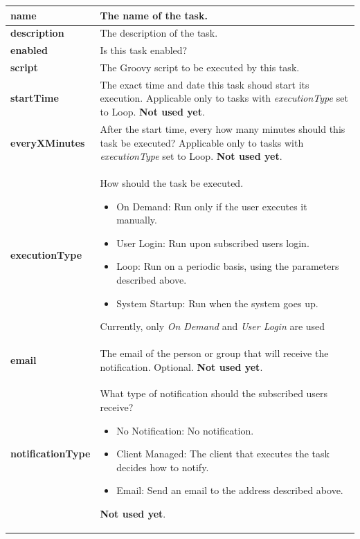 \documentclass[a4paper]{article}
\begin{document}
		\begin{table}[h!]
			\centering
			\begin{tabular}{lp{10cm}}
				\textbf{name} & The name of the task. \\
				\midrule
				\textbf{description} & The description of the task. \\
				\midrule
				\textbf{enabled} & Is this task enabled? \\
				\midrule
				\textbf{script} & The Groovy script to be executed by this task.\\
				\midrule
				\textbf{startTime} & The exact time and date this task shoud start its execution. Applicable only to tasks with \textit{executionType} set to Loop. 
				\textbf{Not used yet}. \\
				\midrule
				\textbf{everyXMinutes} & After the start time, every how many minutes should this task be executed? Applicable only to tasks with \textit{executionType} set to Loop. \textbf{Not used yet}.\\
				\textbf{executionType} & How should the task be executed.
					\begin{itemize}
						\item On Demand: Run only if the user executes it manually.
						\item User Login: Run upon subscribed users login.
						\item Loop: Run on a periodic basis, using the parameters described above.
						\item System Startup: Run when the system goes up.
					\end{itemize}
					Currently, only \textit{On Demand} and \textit{User Login} are used\\
				\midrule
				\textbf{email} & The email of the person or group that will receive the notification. Optional. \textbf{Not used yet}.\\
				\midrule
				\textbf{notificationType} & What type of notification should the subscribed users receive?
					\begin{itemize}
						\item No Notification: No notification.
						\item Client Managed: The client that executes the task decides how to notify.
						\item Email: Send an email to the address described above.
					\end{itemize}
					\textbf{Not used yet}.
			\end{tabular}
		\end{table}
		
\end{document}
